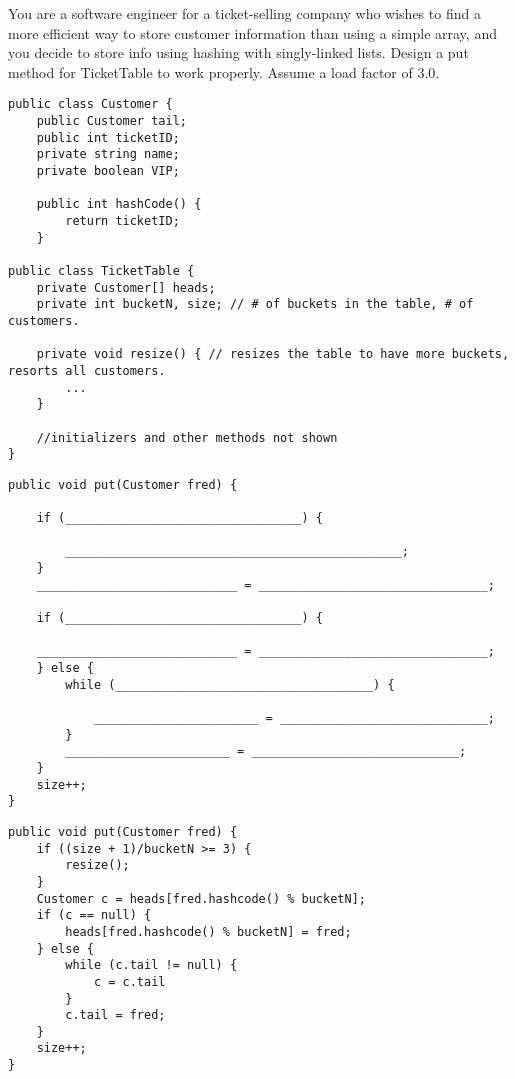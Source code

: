 \begin{blocksection} 

You are a software engineer for a ticket-selling company who wishes to find a more efficient way to store customer information than using a simple array, and you decide to store info using hashing with singly-linked lists. Design a put method for TicketTable to work properly. Assume a load factor of 3.0.
\\

\begin{lstlisting}
public class Customer {
    public Customer tail;
    public int ticketID;
    private string name;
    private boolean VIP;
    
    public int hashCode() {
        return ticketID;
    }
    
public class TicketTable {
    private Customer[] heads;
    private int bucketN, size; // # of buckets in the table, # of customers.

    private void resize() { // resizes the table to have more buckets, resorts all customers.
        ...
    }
    
    //initializers and other methods not shown
}
\end{lstlisting}
\end{blocksection}
\clearpage

\question

\begin{lstlisting}
public void put(Customer fred) {

    if (_________________________________) {
    
        _______________________________________________;
    }
    ____________________________ = ________________________________;
    
    if (_________________________________) {
    
    ____________________________ = ________________________________;
    } else {
        while (____________________________________) {
        
            _______________________ = _____________________________;
        }
        _______________________ = _____________________________;
    }
    size++;
}
\end{lstlisting}

\begin{solution}
\begin{lstlisting}
public void put(Customer fred) {
    if ((size + 1)/bucketN >= 3) {
        resize();
    }
    Customer c = heads[fred.hashcode() % bucketN];
    if (c == null) {
        heads[fred.hashcode() % bucketN] = fred;
    } else {
        while (c.tail != null) {
            c = c.tail
        }
        c.tail = fred;
    }
    size++;
}
\end{lstlisting}
\end{solution}
